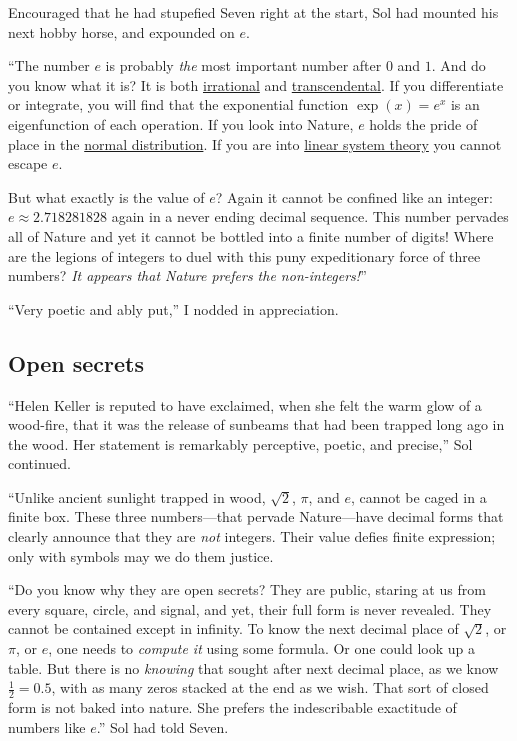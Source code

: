 \documentclass[
  a4paper,
]{article}
\begin{document}
Encouraged that he had stupefied Seven right at the start, Sol had
mounted his next hobby horse, and expounded on \(e\).

``The number \(e\) is probably \emph{the} most important number after
\(0\) and \(1\). And do you know what it is? It is both
\href{https://mathworld.wolfram.com/IrrationalNumber.html}{irrational}
and
\href{https://en.wikipedia.org/wiki/Transcendental_number}{transcendental}.
If you differentiate or integrate, you will find that the exponential
function \(\exp(x) = e^x\) is an eigenfunction of each operation. If you
look into Nature, \(e\) holds the pride of place in the
\href{https://www.khanacademy.org/math/statistics-probability/modeling-distributions-of-data/normal-distributions-library/a/normal-distributions-review}{normal
distribution}. If you are into
\href{https://www.cns.nyu.edu/~david/handouts/linear-systems/linear-systems.html}{linear
system theory} you cannot escape \(e\).

But what exactly is the value of \(e\)? Again it cannot be confined like
an integer: \(e \approx 2.718281828\) again in a never ending decimal
sequence. This number pervades all of Nature and yet it cannot be
bottled into a finite number of digits! Where are the legions of
integers to duel with this puny expeditionary force of three numbers?
\emph{It appears that Nature prefers the non-integers!}''

``Very poetic and ably put,'' I nodded in appreciation.

\subsection{Open secrets}\label{open-secrets}

``Helen Keller is reputed to have exclaimed, when she felt the warm glow
of a wood-fire, that it was the release of sunbeams that had been
trapped long ago in the wood. Her statement is remarkably perceptive,
poetic, and precise,'' Sol continued.

``Unlike ancient sunlight trapped in wood, \(\sqrt{2}\), \(\pi\), and
\(e\), cannot be caged in a finite box. These three numbers---that
pervade Nature---have decimal forms that clearly announce that they are
\emph{not} integers. Their value defies finite expression; only with
symbols may we do them justice.

``Do you know why they are open secrets? They are public, staring at us
from every square, circle, and signal, and yet, their full form is never
revealed. They cannot be contained except in infinity. To know the next
decimal place of \(\sqrt{2}\), or \(\pi\), or \(e\), one needs to
\emph{compute it} using some formula. Or one could look up a table. But
there is no \emph{knowing} that sought after next decimal place, as we
know \(\frac{1}{2} = 0.5\), with as many zeros stacked at the end as we
wish. That sort of closed form is not baked into nature. She prefers the
indescribable exactitude of numbers like \(e\).'' Sol had told Seven.
\end{document}

